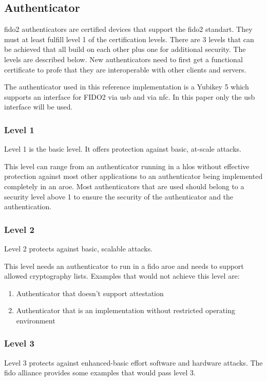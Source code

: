 \documentclass[a4paper, 11pt]{scrartcl}
\begin{document}
\subsection{Authenticator}
\gls{fido2} authenticators are certified devices that support the \gls{fido2} standart. They must at least fulfill level 1 of the certification levels. There are 3 levels that can be achieved that all build on each other plus one for additional security. The levels are described below. New authenticators need to first get a functional certificate to profe that they are interoperable with other clients and servers.

The authenticator used in this reference implementation is a Yubikey 5 which supports an interface for FIDO2 via \gls{usb} and via \gls{nfc}. In this paper only the \gls{usb} interface will be used.

\subsubsection{Level 1}
Level 1 is the basic level. It offers protection against basic, at-scale attacks. \cite{fido:authenticator:level1}

This level can range from an authenticator running in a \gls{hlos} without effective protection against most other applications to an authenticator being implemented completely in an \gls{aroe}. Most authenticators that are used should belong to a security level above 1 to ensure the security of the authenticator and the authentication. \cite{fido:authenticator:level1}

\subsubsection{Level 2}
Level 2 protects against basic, scalable attacks. \cite{fido:authenticator:level2}

This level needs an authenticator to run in a \gls{fido} \gls{aroe} and needs to support allowed cryptography lists. Examples that would not achieve this level are: \cite{fido:authenticator:level2, fido:authenticator:allowedEnvironment}
\begin{enumerate}
  \item Authenticator that doesn't support attestation
  \item Authenticator that is an implementation without restricted operating environment 
\end{enumerate}

\subsubsection{Level 3}
Level 3 protects against enhanced-basic effort software and hardware attacks. The fido alliance provides some examples that would pass level 3. \cite{fido:authenticator:level3}
\end{document}
